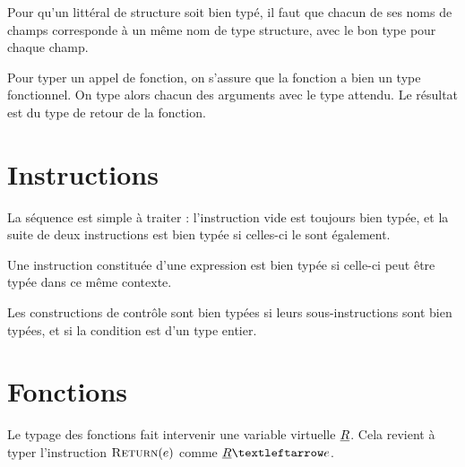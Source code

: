 Pour qu'un littéral de structure soit bien typé, il faut que chacun de ses noms
de champs corresponde à un même nom de type structure, avec le bon type pour
chaque champ.

\begin{mathpar}
\end{mathpar}

Pour typer un appel de fonction, on s'assure que la fonction a bien un type
fonctionnel. On type alors chacun des arguments avec le type attendu. Le
résultat est du type de retour de la fonction.

\begin{mathpar}
\end{mathpar}

\section{Instructions}

La séquence est simple à traiter : l'instruction vide est toujours bien typée,
et la suite de deux instructions est bien typée si celles-ci le sont également.

\begin{mathpar}

\end{mathpar}

Une instruction constituée d'une expression est bien typée si celle-ci peut être
typée dans ce même contexte.

\begin{mathpar}
\end{mathpar}

Les constructions de contrôle sont bien typées si leurs sous-instructions sont
bien typées, et si la condition est d'un type entier.

\begin{mathpar}

\end{mathpar}

\section{Fonctions}

Le typage des fonctions fait intervenir une variable virtuelle $\vRet$. Cela
revient à typer l'instruction $\iReturn{e}$ comme $\vRet ← e$.

\begin{mathpar}
\end{mathpar}


